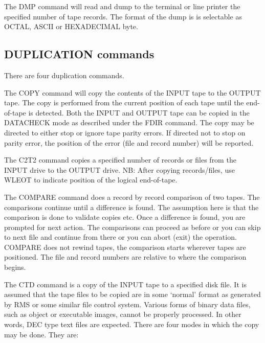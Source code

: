 The DMP command will read and dump to the terminal or line printer the specified
number of tape records.
The format of the dump is is selectable as OCTAL, ASCII or HEXADECIMAL byte.

\subsection{DUPLICATION commands}

There are four duplication commands.

The COPY command will copy the contents of the INPUT tape to the OUTPUT tape.
The copy is performed from the current position of each tape until the
end-of-tape is detected.
Both the INPUT and OUTPUT tape can be copied in the DATACHECK mode as described
under the FDIR command.
The copy may be directed to either stop or ignore tape parity errors.
If directed not to stop on parity error, the position of the error (file and
record number) will be reported.

The C2T2 command copies a specified number of records or files from the INPUT
drive to the OUTPUT drive.
NB: After copying records/files, use WLEOT to indicate position of the logical
end-of-tape.

The COMPARE command does a record by record comparison of two tapes.
The comparisons continue until a difference is found.
The assumption here is that the comparison is done to validate copies etc.
Once a difference is found, you are prompted for next action.
The comparisons can proceed as before or you can skip to next file and continue
from there or you can abort (exit) the operation.
COMPARE does not rewind tapes, the comparison starts wherever tapes are
positioned.
The file and record numbers are relative to where the comparison begins.

The CTD command is a copy of the INPUT tape to a specified disk file.
It is assumed that the tape files to be copied are in some `normal' format as
generated by RMS or some similar file control system.
Various forms of binary data files, such as object or executable images, cannot
be properly processed.
In other words, DEC type text files are expected.
There are four modes in which the copy may be done.
They are:

